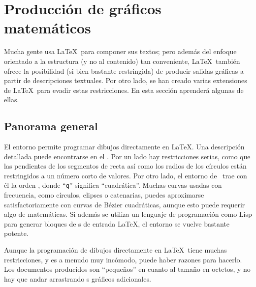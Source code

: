 \setcounter{chapter}{4}
\newcommand{\graphicscompanion}{\emph{The \LaTeX{} Graphics Companion}~\cite{graphicscompanion}} 
\newcommand{\hobby}{\emph{A User's Manual for MetaPost}~\cite{metapost}}
\newcommand{\hoenig}{\emph{\TeX{} Unbound}~\cite{unbound}}
\newcommand{\graphicsinlatex}{\emph{Graphics in \LaTeXe{}}~\cite{ursoswald}}

\chapter{Producción de gráficos matemáticos}
\label{chap:graphics}

\begin{intro}
Mucha gente usa \LaTeX\ para componer sus textos; pero además del enfoque orientado a la estructura (y no al contenido) tan conveniente, \LaTeX\ también ofrece la posibilidad (si bien bastante restringida) de producir salidas gráficas a partir de descripciones textuales.  Por otro lado, se han creado varias extensiones de  \LaTeX\ para evadir estas restricciones.  En esta sección aprenderá algunas de ellas.
\end{intro}

\section{Panorama general}

El entorno  permite programar dibujos directamente en \LaTeX.  Una descripción detallada puede encontrarse en el \manual. Por un lado hay restricciones serias, como que las pendientes de los segmentos de recta así como los radios de los círculos están restringidos a un número corto de valores.  Por otro lado, el entorno  de \LaTeXe\ trae con él la orden , donde ``\texttt{q}'' significa ``cuadrática''.  Muchas curvas usadas con frecuencia, como círculos, elipses o catenarias, puedes aproximarse satisfactoriamente con curvas de  B\'ezier cuadráticas, aunque esto puede requerir algo de matemáticas.  Si además se utiliza un lenguaje de programación como Lisp para generar bloques  de \filenomo{}s de entrada \LaTeX, el entorno  se vuelve bastante potente.

Aunque la programación de dibujos directamente en  \LaTeX\ tiene muchas
restricciones, y es a menudo muy incómodo, puede haber razones para hacerlo. Los documentos producidos son ``pequeños'' en cuanto al tamaño en octetos, y no hay que andar  arrastrando \filenomo{}s gráficos adicionales.

